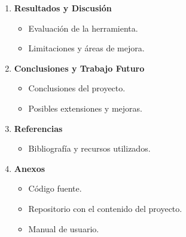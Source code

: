\documentclass[11pt]{article}
\begin{document}
\begin{enumerate}
\item \textbf{Resultados y Discusión}

  \begin{itemize}
  \item Evaluación de la herramienta.
  \item Limitaciones y áreas de mejora.
  \end{itemize}

\item \textbf{Conclusiones y Trabajo Futuro}

  \begin{itemize}
  \item Conclusiones del proyecto.
  \item Posibles extensiones y mejoras.
  \end{itemize}
\item \textbf{Referencias}

  \begin{itemize}
  \item Bibliografía y recursos utilizados.
  \end{itemize}

\item \textbf{Anexos}

  \begin{itemize}
  \item Código fuente.
  \item Repositorio con el contenido del proyecto.
  \item Manual de usuario.
  \end{itemize}
\end{enumerate}
\end{document}
